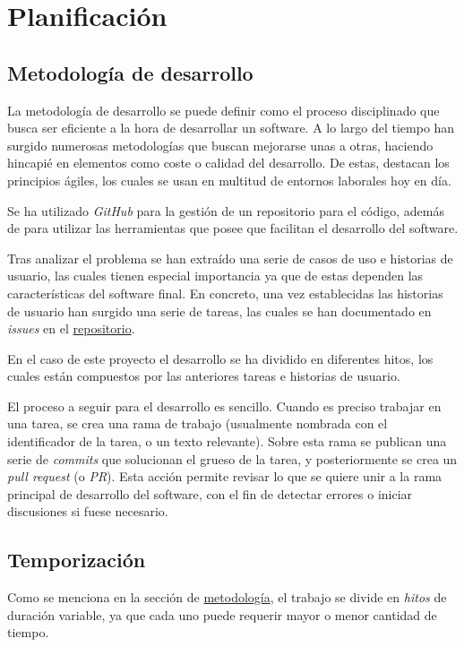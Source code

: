 \chapter{Planificación}

\section{Metodología de desarrollo}
\label{sec:methodology}

La metodología de desarrollo se puede definir como el proceso disciplinado que busca ser eficiente a la hora de desarrollar un software. A lo largo del tiempo han surgido numerosas metodologías que buscan mejorarse unas a otras, haciendo hincapié en elementos como coste o calidad del desarrollo. De estas, destacan los principios ágiles, los cuales se usan en multitud de entornos laborales hoy en día.

Se ha utilizado \textit{GitHub} para la gestión de un repositorio para el código, además de para utilizar las herramientas que posee que facilitan el desarrollo del software.

Tras analizar el problema se han extraído una serie de casos de uso e historias de usuario, las cuales tienen especial importancia ya que de estas dependen las características del software final. En concreto, una vez establecidas las historias de usuario han surgido una serie de tareas, las cuales se han documentado en \textit{issues} en el \href{https://github.com/harvestcore/matroos}{repositorio}.

En el caso de este proyecto el desarrollo se ha dividido en diferentes hitos, los cuales están compuestos por las anteriores tareas e historias de usuario.

El proceso a seguir para el desarrollo es sencillo. Cuando es preciso trabajar en una tarea, se crea una rama de trabajo (usualmente nombrada con el identificador de la tarea, o un texto relevante). Sobre esta rama se publican una serie de \textit{commits} que solucionan el grueso de la tarea, y posteriormente se crea un \textit{pull request} (o \textit{PR}). Esta acción permite revisar lo que se quiere unir a la rama principal de desarrollo del software, con el fin de detectar errores o iniciar discusiones si fuese necesario.

\section{Temporización}

Como se menciona en la sección de \hyperref[sec:methodology]{metodología}, el trabajo se divide en \textit{hitos} de duración variable, ya que cada uno puede requerir mayor o menor cantidad de tiempo.

